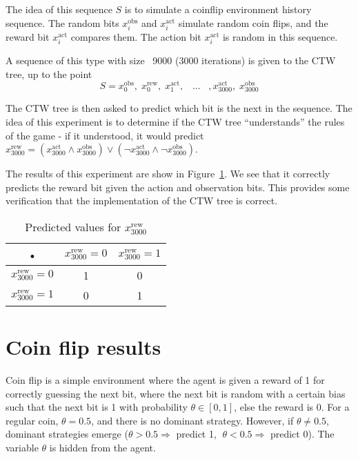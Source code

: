 \documentclass[pdftex,twoside,a4paper]{report}
\newcommand{\bcen}{\begin{center}}
\newcommand{\ecen}{\end{center}}
\begin{document}
The idea of this sequence $S$ is to simulate a coinflip environment history sequence. The random bits $x^{\text{obs}}_i$ and $x^{\text{act}}_i$ simulate random coin flips, and the reward bit $x^{\text{act}}_i$ compares them. The action bit $x^{\text{act}}_i$ is random in this sequence.

A sequence of this type with size ~9000 (3000 iterations) is given to the CTW tree, up to the point
\[
S = x^{\text{obs}}_0,\; x^{\text{rew}}_0,\; x^{\text{act}}_1,\;\;\;...\;\;\;,x^{\text{act}}_{3000},\;x^{\text{obs}}_{3000}
\]

The CTW tree is then asked to predict which bit is the next in the sequence. The idea of this experiment is to determine if the CTW tree ``understands'' the rules of the game - if it understood, it would predict $x^{\text{rew}}_{3000} = (x^{\text{act}}_{3000} \land x^{\text{obs}}_{3000}) \lor (\lnot x^{\text{act}}_{3000} \land \lnot x^{\text{obs}}_{3000})$.

The results of this experiment are show in Figure~\ref{tab:non_det_seq_pred}. We see that it correctly predicts the reward bit given the action and observation bits. This provides some verification that the implementation of the CTW tree is correct.

\begin{table}
\bcen
\bgroup
\def\arraystretch{1.5}
\begin{tabular}{c |c| c }
 • & $x^{\text{rew}}_{3000} = 0$ & $x^{\text{rew}}_{3000} = 1$ \\ 
\hline $x^{\text{rew}}_{3000} = 0$ & 1 & 0 \\ 
\hline $x^{\text{rew}}_{3000} = 1$ & 0 & 1 \\  
\end{tabular}
\egroup
\ecen
\caption{Predicted values for $x^{\text{rew}}_{3000}$}
\label{tab:non_det_seq_pred}
\end{table}

\section{Coin flip results}

 Coin flip is a simple environment where the agent is given a reward of 1 for correctly guessing the next bit, where the next bit is random with a certain bias such that the next bit is 1 with probability $\theta \in [0,1]$, else the reward is 0. For a regular coin, $\theta = 0.5$, and there is no dominant strategy. However, if $\theta \not = 0.5$, dominant strategies emerge ($\theta > 0.5 \Rightarrow $ predict 1, $\; \theta < 0.5 \Rightarrow $ predict 0). The variable $\theta$ is hidden from the agent.
 
\end{document}
